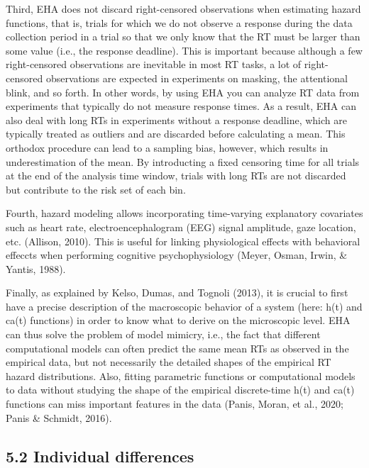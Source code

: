 \documentclass[
  man,floatsintext]{apa6}
\begin{document}
Third, EHA does not discard right-censored observations when estimating hazard functions, that is, trials for which we do not observe a response during the data collection period in a trial so that we only know that the RT must be larger than some value (i.e., the response deadline). This is important because although a few right-censored observations are inevitable in most RT tasks, a lot of right-censored observations are expected in experiments on masking, the attentional blink, and so forth. In other words, by using EHA you can analyze RT data from experiments that typically do not measure response times. As a result, EHA can also deal with long RTs in experiments without a response deadline, which are typically treated as outliers and are discarded before calculating a mean. This orthodox procedure can lead to a sampling bias, however, which results in underestimation of the mean. By introducting a fixed censoring time for all trials at the end of the analysis time window, trials with long RTs are not discarded but contribute to the risk set of each bin.

Fourth, hazard modeling allows incorporating time-varying explanatory covariates such as heart rate, electroencephalogram (EEG) signal amplitude, gaze location, etc. (Allison, 2010). This is useful for linking physiological effects with behavioral effeccts when performing cognitive psychophysiology (Meyer, Osman, Irwin, \& Yantis, 1988).

Finally, as explained by Kelso, Dumas, and Tognoli (2013), it is crucial to first have a precise description of the macroscopic behavior of a system (here: h(t) and ca(t) functions) in order to know what to derive on the microscopic level. EHA can thus solve the problem of model mimicry, i.e., the fact that different computational models can often predict the same mean RTs as observed in the empirical data, but not necessarily the detailed shapes of the empirical RT hazard distributions. Also, fitting parametric functions or computational models to data without studying the shape of the empirical discrete-time h(t) and ca(t) functions can miss important features in the data (Panis, Moran, et al., 2020; Panis \& Schmidt, 2016).

\subsection{5.2 Individual differences}\label{individual-differences}
\end{document}
